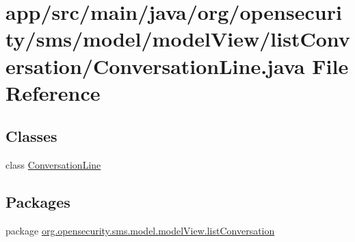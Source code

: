 \hypertarget{a00022}{\section{app/src/main/java/org/opensecurity/sms/model/model\+View/list\+Conversation/\+Conversation\+Line.java File Reference}
\label{a00022}
}
\subsection*{Classes}
\begin{DoxyCompactItemize}
\item 
class \hyperlink{a00009}{Conversation\+Line}
\end{DoxyCompactItemize}
\subsection*{Packages}
\begin{DoxyCompactItemize}
\item 
package \hyperlink{a00038}{org.\+opensecurity.\+sms.\+model.\+model\+View.\+list\+Conversation}
\end{DoxyCompactItemize}
